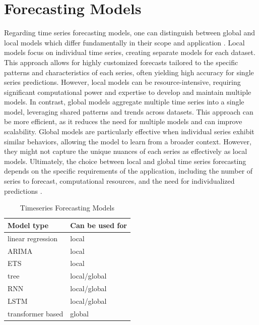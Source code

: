 \section{Forecasting Models}
\label{sec:forecasting_models}
Regarding time series forecasting models, one can distinguish between global and local models which differ fundamentally in their scope and application \parencite{montero2021principles}. Local models focus on individual time series, creating separate models for each dataset. This approach allows for highly customized forecasts tailored to the specific patterns and characteristics of each series, often yielding high accuracy for single series predictions. However, local models can be resource-intensive, requiring significant computational power and expertise to develop and maintain multiple models. In contrast, global models aggregate multiple time series into a single model, leveraging shared patterns and trends across datasets. This approach can be more efficient, as it reduces the need for multiple models and can improve scalability. Global models are particularly effective when individual series exhibit similar behaviors, allowing the model to learn from a broader context. However, they might not capture the unique nuances of each series as effectively as local models. Ultimately, the choice between local and global time series forecasting depends on the specific requirements of the application, including the number of series to forecast, computational resources, and the need for individualized predictions \parencite{montero2021principles}.

\begin{table}[h]
    \centering
    \begin{tabular}{ll}
        \toprule
        \textbf{Model type} & \textbf{Can be used for} \\
        \midrule
        linear regression   & local                    \\
        \midrule
        ARIMA               & local                    \\
        \midrule
        ETS                 & local                    \\
        \midrule
        tree                & local/global             \\
        \midrule
        RNN                 & local/global             \\
        \midrule
        LSTM                & local/global             \\
        \midrule
        transformer based   & global                   \\

        \bottomrule
    \end{tabular}
    \caption{Timeseries Forecasting Models}
    \label{tab:timeseries_models}
\end{table}

